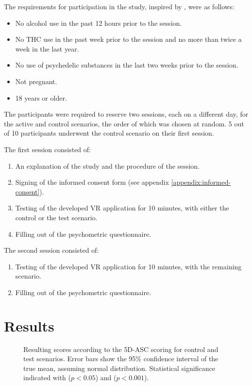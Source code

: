 The requirements for participation in the study, inspired by \textcite{bartossek2021altered}, were as follows:
\begin{itemize}
    \setlength{\itemsep}{0pt}
    \setlength{\parskip}{0pt}
    \item No alcohol use in the past 12 hours prior to the session.
    \item No \acs{THC} use in the past week prior to the session and no more than twice a week in the last year.
    \item No use of psychedelic substances in the last two weeks prior to the session.
    \item Not pregnant.
    \item 18 years or older.
\end{itemize}

The participants were required to reserve two sessions, each on a different day, for the active and control scenarios, the order of which was chosen at random. 5 out of 10 participants underwent the control scenario on their first session.

The first session consisted of:
\begin{enumerate}
    \setlength{\itemsep}{0pt}
    \setlength{\parskip}{0pt}
    \item An explanation of the study and the procedure of the session.
    \item Signing of the informed consent form (see appendix \ref{appendix:informed-consent}).
    \item Testing of the developed VR application for 10 minutes, with either the control or the test scenario.
    \item Filling out of the psychometric questionnaire.
\end{enumerate}

The second session consisted of:
\begin{enumerate}
    \setlength{\itemsep}{0pt}
    \setlength{\parskip}{0pt}
    \item Testing of the developed VR application for 10 minutes, with the remaining scenario.
    \item Filling out of the psychometric questionnaire.
\end{enumerate}

\section{Results}

\begin{figure}[H]
    \centering
    \caption{
        Resulting scores according to the \ac{5D-ASC} scoring for control and test scenarios.
        Error bars show the 95\% confidence interval of the true mean, assuming normal distribution.
        Statistical significance indicated with \raisebox{-0.7ex}{*} ($p < 0.05$) and \raisebox{-0.7ex}{***} ($p < 0.001$).
    }
    \label{fig:results-5d-asc}
\end{figure}

